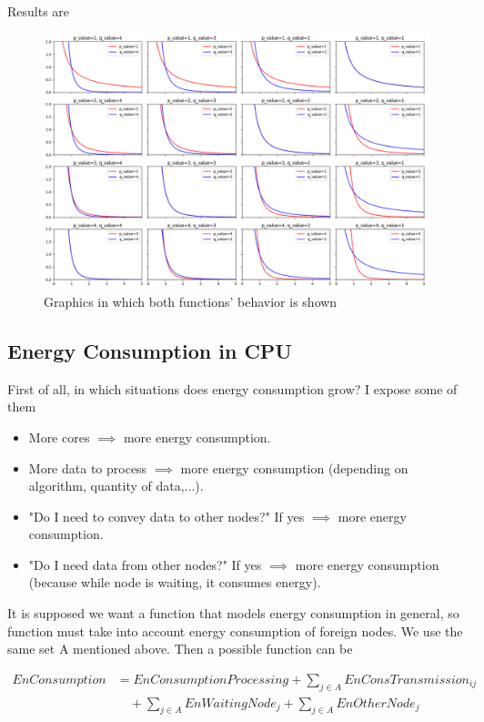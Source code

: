 \documentclass{article}
\begin{document}
Results are

\begin{figure}[h]
  \centering
  \includegraphics[width=1.3\textwidth]{graficas.png}
  \caption{Graphics in which both functions' behavior is shown}
  \label{fig:etiqueta}
\end{figure}

  \clearpage
  \subsection{Energy Consumption in CPU}
  First of all, in which situations does energy consumption grow? I expose some of them 
  
	\begin{itemize}
       \item More cores \(\implies\) more energy consumption. 
       \item More data to process \(\implies\) more energy consumption (depending on algorithm, quantity of data,...).
       \item "Do I need to convey data to other nodes?" If yes \(\implies\) more energy consumption.
       \item "Do I need data from other nodes?" If yes \(\implies\) more energy consumption (because while node is waiting, it consumes energy).
	\end{itemize}
 It is supposed we want a function that models energy consumption in general, so function must take into account energy consumption of foreign nodes. We use the same set A mentioned above. Then a possible function can be
 
\begin{align*}
    EnConsumption &= EnConsumptionProcessing + \sum_{j \in A} EnConsTransmission_{ij} \\
    &\quad + \sum_{j \in A} EnWaitingNode_j + \sum_{j \in A} EnOtherNode_j
\end{align*}
\end{document}
